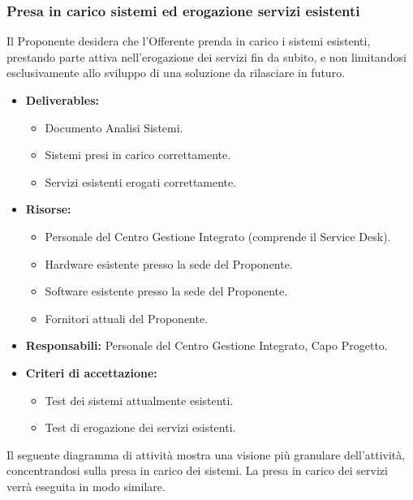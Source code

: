 			\subsubsection{Presa in carico sistemi ed erogazione servizi esistenti}  
            	Il Proponente desidera che l'Offerente prenda in carico i sistemi esistenti, prestando parte attiva nell'erogazione dei servizi fin da subito, e non limitandosi esclusivamente allo sviluppo di una soluzione da rilasciare in futuro. 
                \begin{itemize}
                \item \textbf{Deliverables:} 
                	\begin{itemize}
                    	\item Documento Analisi Sistemi.
                    	\item Sistemi presi in carico correttamente.
                        \item Servizi esistenti erogati correttamente.
                    \end{itemize}
                \item  \textbf{Risorse:} 
                \begin{itemize}
                	\item Personale del Centro Gestione Integrato (comprende il Service Desk).
                	\item Hardware esistente presso la sede del Proponente.
                    \item Software esistente presso la sede del Proponente.
                    \item Fornitori attuali del Proponente.
                \end{itemize}
                \item  \textbf{Responsabili:} Personale del Centro Gestione Integrato, Capo Progetto.
                \item  \textbf{Criteri di accettazione:} 
                \begin{itemize}
					\item Test dei sistemi attualmente esistenti.
                    \item Test di erogazione dei servizi esistenti.
                \end{itemize}
                \end{itemize}
                Il seguente diagramma di attività mostra una visione più granulare dell'attività, concentrandosi sulla presa in carico dei sistemi. La presa in carico dei servizi verrà eseguita in modo similare.
